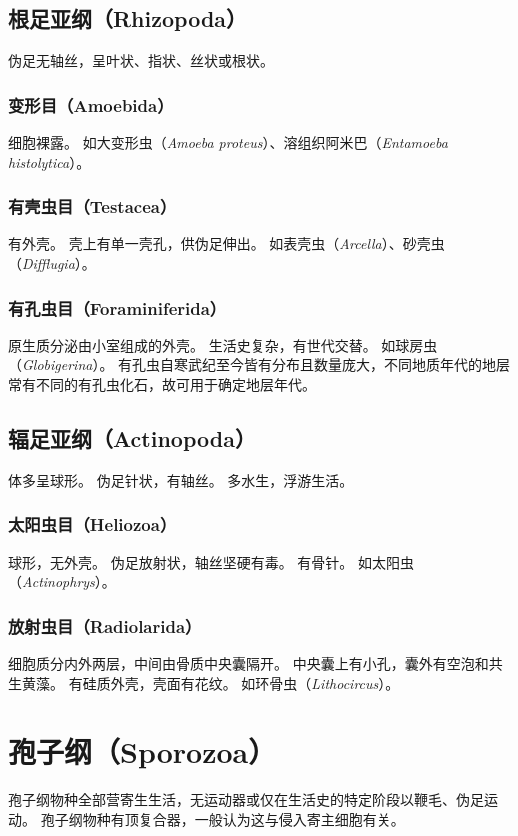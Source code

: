 \documentclass[11pt]{article}
\begin{document}
\subsection{根足亚纲（Rhizopoda）}
伪足无轴丝，呈叶状、指状、丝状或根状。

\subsubsection{变形目（Amoebida）}
细胞裸露。
如大变形虫（\textit{Amoeba proteus}）、溶组织阿米巴（\textit{Entamoeba histolytica}）。

\subsubsection{有壳虫目（Testacea）}
有外壳。
壳上有单一壳孔，供伪足伸出。
如表壳虫（\textit{Arcella}）、砂壳虫（\textit{Difflugia}）。

\subsubsection{有孔虫目（Foraminiferida）}
原生质分泌由小室组成的外壳。
生活史复杂，有世代交替。
如球房虫（\textit{Globigerina}）。
有孔虫自寒武纪至今皆有分布且数量庞大，不同地质年代的地层常有不同的有孔虫化石，故可用于确定地层年代。

\subsection{辐足亚纲（Actinopoda）}
体多呈球形。
伪足针状，有轴丝。
多水生，浮游生活。

\subsubsection{太阳虫目（Heliozoa）}
球形，无外壳。
伪足放射状，轴丝坚硬有毒。
有骨针。
如太阳虫（\textit{Actinophrys}）。

\subsubsection{放射虫目（Radiolarida）}
细胞质分内外两层，中间由骨质中央囊隔开。
中央囊上有小孔，囊外有空泡和共生黄藻。
有硅质外壳，壳面有花纹。
如环骨虫（\textit{Lithocircus}）。

\section{孢子纲（Sporozoa）}
孢子纲物种全部营寄生生活，无运动器或仅在生活史的特定阶段以鞭毛、伪足运动。
孢子纲物种有顶复合器，一般认为这与侵入寄主细胞有关。
\end{document}
